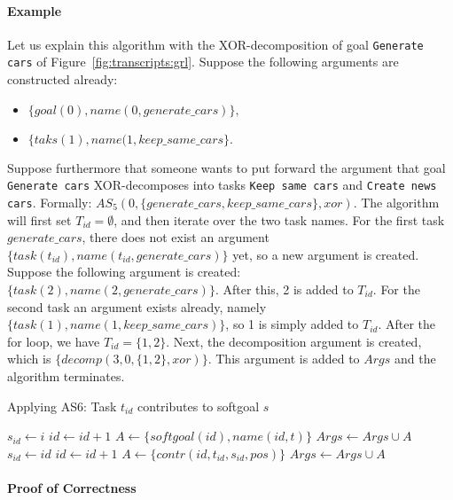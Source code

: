 \paragraph{Example}
Let us explain this algorithm with the XOR-decomposition of goal \texttt{Generate cars} of Figure~\ref{fig:transcripts:grl}. Suppose the following arguments are constructed already:
\begin{itemize}
\item $\{goal(0),name(0,generate\_cars)\},$
\item $\{taks(1),name(1,keep\_same\_cars\}.$
\end{itemize}
Suppose furthermore that someone wants to put forward the argument that goal \texttt{Generate cars} XOR-decomposes into tasks \texttt{Keep same cars} and \texttt{Create news cars}. Formally: $AS_5(0,\{generate\_cars,keep\_same\_cars\},xor)$. The algorithm will first set $T_{id}=\emptyset$, and then iterate over the two task names. For the first task $generate\_cars$, there does not exist an argument $\{task(t_{id}),name(t_{id},generate\_cars)\}$ yet, so a  new argument is created. Suppose the following argument is created: $\{task(2),name(2,generate\_cars)\}.$ After this, 2 is added to $T_{id}$. For the second task an argument exists already, namely $\{task(1),name(1,keep\_same\_cars)\}$, so 1 is simply added to $T_{id}$. After the for loop, we have $T_{id}=\{1,2\}$. Next, the decomposition argument is created, which is $\{decomp(3,0,\{1,2\},xor)\}$. This argument is added to $Args$ and the algorithm terminates.

\begin{algorithm}[h]
  \caption{Applying AS6: Task $t_{id}$ contributes to softgoal $s$}\label{alg:as6}
  \begin{algorithmic}[1]
     \label{alg:as6:if}
        \State $s_{id} \gets i$
    \Else
      \State $id\gets id+1$
      \State $A \gets \{softgoal(id),name(id,t)\}$
      \State $Args \gets Args\cup A$
      \State $s_{id} \gets id$
    \EndIf
    \State $id\gets id+1$
    \State $A\gets \{contr(id, t_{id}, s_{id}, pos)\}$
    \State $Args \gets Args\cup A$
    \EndProcedure
  \end{algorithmic}
\end{algorithm}

\paragraph{Proof of Correctness}

